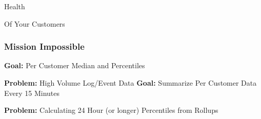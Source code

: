 

\begin{frame}[standout]
    Health

    Of Your Customers
\end{frame}


\begin{frame}
    \frametitle{Mission Impossible}

    \textbf{Goal:} Per Customer Median and Percentiles

    \textbf{Problem:} High Volume Log/Event Data
    \vskip 1cm
    \textbf{Goal:} Summarize Per Customer Data Every 15 Minutes

    \textbf{Problem:} Calculating 24 Hour (or longer) Percentiles from Rollups
\end{frame}


